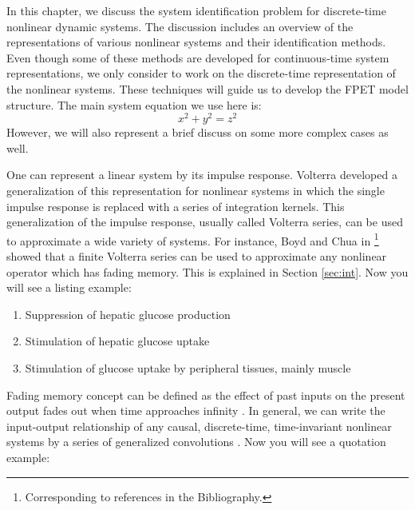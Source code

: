 \documentclass{iitthesis}
\begin{document}
\textpages     %


 \label{sec:int}

In this chapter, we discuss the system identification problem for
discrete-time nonlinear dynamic systems. The discussion includes
an overview of the representations of various nonlinear systems
and their identification methods. Even though some of these
methods are developed for continuous-time system representations,
we only consider to work on the discrete-time representation of
the nonlinear systems. These techniques will guide us to develop
the FPET model structure. The main system equation we use here is:
\begin{equation}
 x^2+y^2 = z^2
 \label{eq:sample}   %
\end{equation}
However, we will also represent a brief discuss on some more
complex cases as well.


One can represent a linear system by its impulse response.
Volterra developed a generalization of this representation for
nonlinear systems in which the single impulse response is replaced
with a series of integration kernels. This generalization of the
impulse response, usually called Volterra series, can be used to
approximate a wide variety of systems. For instance, Boyd and Chua
in \cite{HK}\footnote{Corresponding to references in the
Bibliography.} showed that a finite Volterra series can be used to
approximate any nonlinear operator which has fading memory. This
is explained in Section \ref{sec:int}. Now you will see a listing
example:
\begin{enumerate}
  \item Suppression of hepatic glucose production
  \item Stimulation of hepatic glucose uptake
  \item Stimulation of glucose uptake by peripheral tissues,
  mainly muscle
\end{enumerate}

Fading memory concept can be defined as the effect of past inputs
on the present output fades out when time approaches infinity
\cite{Pan}. In general, we can write the input-output relationship
of any causal, discrete-time, time-invariant nonlinear systems by
a series of generalized convolutions \cite{MG}. Now you will see a
quotation example:
\end{document}
